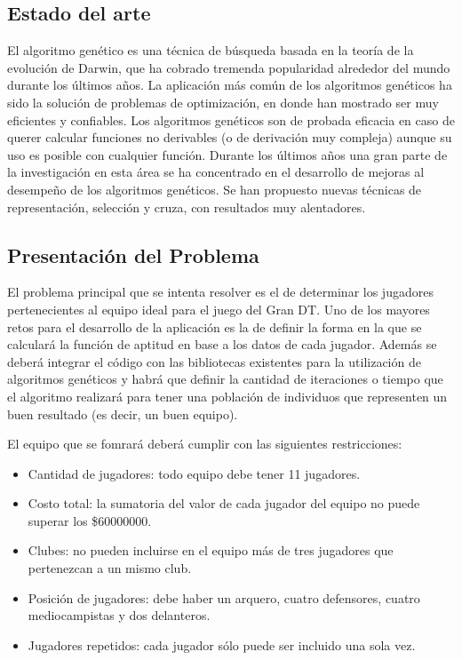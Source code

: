 \documentclass[pdftex,a4paper,10.5pt]{article}
\begin{document}
\subsection{Estado del arte}
El algoritmo genético es una técnica de búsqueda basada en la teoría de la evolución de Darwin, que ha cobrado tremenda popularidad alrededor del mundo durante los últimos años.
La aplicación más común de los algoritmos genéticos ha sido la solución de problemas de optimización, en donde han mostrado ser muy eficientes y confiables. Los algoritmos genéticos son de probada eficacia en caso de querer calcular funciones no derivables (o de derivación muy compleja) aunque su uso es posible con cualquier función.
Durante los últimos años una gran parte de la investigación en esta área se ha concentrado en el desarrollo de mejoras al desempeño de los algoritmos genéticos. Se han propuesto nuevas técnicas de representación, selección y cruza, con resultados muy alentadores. 

\subsection{Presentaci\'on del Problema}

El problema principal que se intenta resolver es el de determinar los jugadores pertenecientes al equipo ideal para el juego del Gran DT. Uno de los mayores retos para el desarrollo de la aplicaci\'on es la de definir la forma en la que se calcular\'a la funci\'on de aptitud en base a los datos de cada jugador. Adem\'as se deber\'a integrar el c\'odigo con las bibliotecas existentes para la utilizaci\'on de algoritmos gen\'eticos y habr\'a que definir la cantidad de iteraciones o tiempo que el algoritmo realizar\'a para tener una poblaci\'on de individuos que representen un buen resultado (es decir, un buen equipo).

El equipo que se fomrar\'a deber\'a cumplir con las siguientes restricciones:

\begin{itemize}
\item Cantidad de jugadores: todo equipo debe tener 11 jugadores.
\item Costo total: la sumatoria del valor de cada jugador del equipo no puede superar los \$60000000.
\item Clubes: no pueden incluirse en el equipo m\'as de tres jugadores que pertenezcan a un mismo club.
\item Posici\'on de jugadores: debe haber un arquero, cuatro defensores, cuatro mediocampistas y dos delanteros.
\item Jugadores repetidos: cada jugador s\'olo puede ser incluido una sola vez.

\end{itemize}
\end{document}
